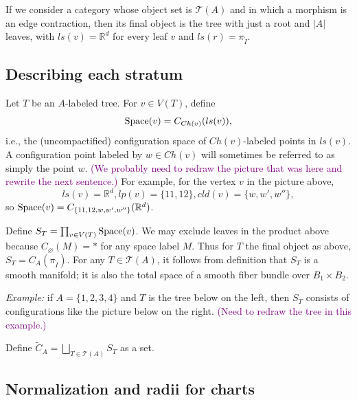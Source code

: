 \documentclass[11pt]{article}
\theoremstyle{definition}
\newtheorem{dfn}[thm]{Definition}
\theoremstyle{remark}
\def\wt#1{\widetilde{#1}}
\def\R{\mathbb{R}}
\def\cT{\mathcal{T}}
\def\rI{{\mathring{I}}}
\def\Ch{{{Ch}}}
\def\cmt#1{\textcolor{purple}{(#1)}}
\def\tn#1{\textnormal{#1}}
\begin{document}
If we consider a category whose object set is $\mathcal{T}(A)$ and in which a morphism is an edge contraction, then its final object is the tree with just a root and $|A|$ leaves, with $ls(v)=\R^d$ for every leaf $v$ and $ls(r)=\pi_\rI$.


\subsection{Describing each stratum}
\label{stratum2_sec}

Let $T$ be an $A$-labeled tree. 
For $v\in V(T)$, define  
$$\tn{Space}(v)=C_{\Ch(v)}(ls(v)),$$
i.e., the (uncompactified) configuration space of $\Ch(v)$-labeled points in $ls(v)$.  
A configuration point labeled by $w \in \Ch(v)$ will sometimes be referred to as simply the point $w$.
\cmt{We probably need to redraw the picture that was here and rewrite the next sentence.}
For example, for the vertex $v$ in the picture above, $$ls(v)=\R^d, lp(v)=\{11,12\}, cld(v)=\{w,w',w''\},$$
so $\tn{Space}(v)=C_{\{11,12,w,w',w''\}}(\R^d)$. 

Define $S_T=\prod_{v\in V(T)}\tn{Space}(v)$.  
We may exclude leaves  in the product above because $C_\varnothing(M)=\ast$ for any space label $M$.
Thus for $T$ the final object as above, $S_T=C_A(\pi_\rI)$. 
For any $T \in \mathcal{T}(A)$, it follows from definition that $S_T$ is a smooth manifold; it is also the total space of a smooth fiber bundle over $B_1\times B_2$. 

{\it Example:} if $A=\{1,2,3,4\}$ and $T$ is the tree below on the left, then $S_T$ consists of configurations like the picture below on the right. \cmt{Need to redraw the tree in this example.}


Define $\wt{C}_A=\bigsqcup_{T\in\cT(A)}S_T$ as a set. 

\subsection{Normalization and radii for charts}
\label{normalization_subsec}


\end{document}

